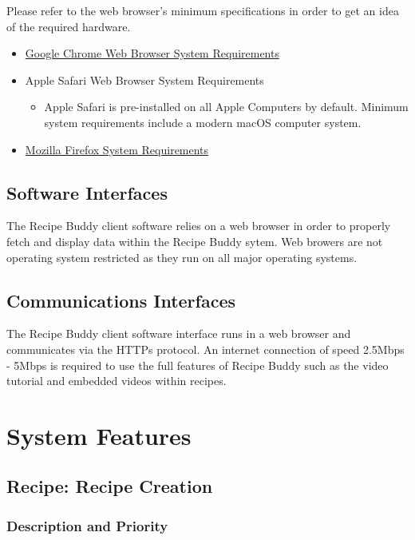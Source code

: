 \documentclass{scrreprt}
\begin{document}
Please refer to the web browser's minimum specifications in order to get an idea of the required hardware.

\begin{itemize}
    \item \href{https://support.google.com/chrome/a/answer/7100626?hl=en}{Google Chrome Web Browser System Requirements}
    \item Apple Safari Web Browser System Requirements
          \begin{itemize}
              \item Apple Safari is pre-installed on all Apple Computers by default. Minimum system requirements include a modern macOS computer system.
          \end{itemize}
    \item \href{https://www.mozilla.org/en-US/firefox/92.0.1/system-requirements/}{Mozilla Firefox System Requirements}
\end{itemize}

\section{Software Interfaces}
The \gls{Recipe Buddy} client software relies on a web browser in order to properly fetch and display data within the \gls{Recipe Buddy} sytem. Web browers are not operating system restricted as they run on all major operating systems.

\section{Communications Interfaces}
The \gls{Recipe Buddy} client software interface runs in a web browser and communicates via the \gls{HTTPs} protocol. An internet connection of speed 2.5Mbps - 5Mbps is required to use the full features of \gls{Recipe Buddy} such as the video tutorial and embedded videos within recipes.

\chapter{System Features}

\section{Recipe: Recipe Creation}

\subsection{Description and Priority}
\end{document}
